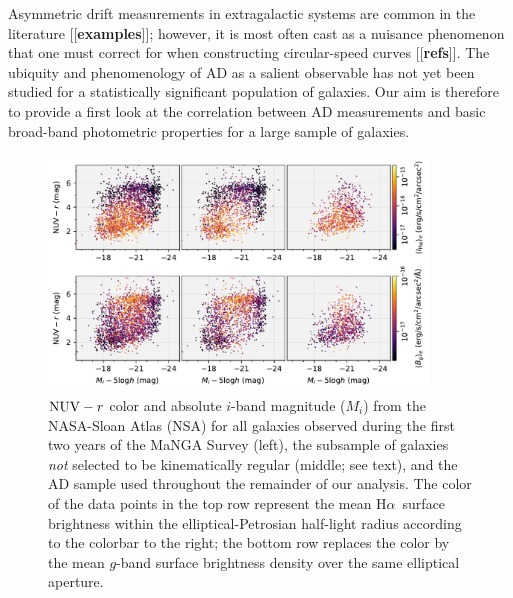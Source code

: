\documentclass[apj,iop,revtex4,numberedappendix]{emulateapj}
\newcommand{\comment}[2][todo]{{\color{#1}[[{\bf #2}]]}}
\newcommand{\halpha}{H$\alpha$}
\begin{document}
Asymmetric drift measurements in extragalactic systems are common in the
literature \comment{examples}; however, it is most often cast as a nuisance
phenomenon that one must correct for when constructing circular-speed
curves \comment{refs}.  The ubiquity and phenomenology of AD as a
salient observable has not yet been studied for a statistically
significant population of galaxies.  Our aim is therefore to provide a
first look at the correlation between AD measurements and basic
broad-band photometric properties for a large sample of galaxies.

\begin{figure}
%
\begin{center}
%
\includegraphics[width=0.9\textwidth]{figs/cmd_flux.pdf}
%
\end{center}
%
\caption{
%
${\rm NUV} - r$ color and absolute $i$-band magnitude ($M_i$) from the
NASA-Sloan Atlas (NSA) for all galaxies observed during the first two
years of the MaNGA Survey (left), the subsample of galaxies {\em not}
selected to be kinematically regular (middle; see text), and the AD
sample used throughout the remainder of our analysis.  The color of the
data points in the top row represent the mean \halpha\ surface
brightness within the elliptical-Petrosian half-light radius according
to the colorbar to the right; the bottom row replaces the color by the
mean $g$-band surface brightness density over the same elliptical
aperture.
%
}
%
\label{fig:sample}
%
\end{figure}
\end{document}
